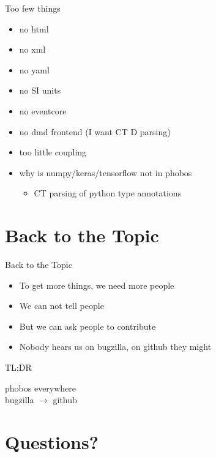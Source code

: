 \documentclass[aspectratio=169,notes]{beamer}
\begin{document}
	\begin{frame}[fragile]{Too few things}
		\begin{itemize}
			\item no html
			\item no xml
			\item no yaml
			\item no SI units
			\item no eventcore
			\item no dmd frontend (I want CT D parsing)
			\item too little coupling
			\item why is numpy/keras/tensorflow not in phobos
			\begin{itemize}
				\item CT parsing of python type annotations
			\end{itemize}
		\end{itemize}
	\end{frame}

	\section{Back to the Topic}
	\begin{frame}[fragile]{Back to the Topic}
		\begin{itemize}
			\item To get more things, we need more people
			\pause
			\item We can not tell people\\[1cm]
			\pause
			\item {\Large But we can ask people to contribute}\\[1cm]
			\pause
			\item {\Large Nobody hears us on bugzilla, on github they might}
		\end{itemize}
	\end{frame}
	\begin{frame}[fragile]{TL;DR}
		\Huge
		\begin{center}
		phobos everywhere\\[1cm]
		bugzilla $\rightarrow$ github\\[1cm]
		\end{center}
	\end{frame}
	\section{Questions?}
\end{document}
